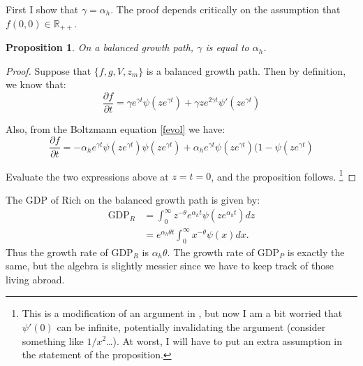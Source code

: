 \documentclass[12pt]{article}
\newtheorem{proposition}[theorem]{Proposition}
\begin{document}
First I show that $\gamma = \alpha_h$.
The proof depends critically on the assumption that $f(0,0)\in \mathbb{R}_{++}$.

\begin{proposition}
  \label{gammaeqalpha}
On a balanced growth path, $\gamma$ is equal to $\alpha_h$.
\end{proposition}
\begin{proof}
    Suppose that $\{f,g,V,z_m\}$ is a balanced growth path.  Then by definition, we know that:
    \begin{equation}
        \label{BoltzLHS}
        \frac{\partial f}{\partial t} = \gamma e^{\gamma t} \psi(z e^{\gamma t}) + \gamma z e^{2 \gamma t} \psi'(z e^{\gamma t})
    \end{equation}

    Also, from the Boltzmann equation \eqref{fevol} we have:
    \[
        \frac{\partial f}{\partial t} = - \alpha_h e^{\gamma t} \psi(z e^{\gamma t}) \psi(z e^{\gamma t}) + \alpha_h e^{\gamma t} \psi(z e^{\gamma t}) (1 - \psi(z e^{\gamma t})
    \]

    Evaluate the two expressions above at $z=t=0$, and the proposition follows. \footnote{
        This is a modification of an argument in \citet{LucasMoll2012}, but now I am a bit worried that $\psi'(0)$ can be infinite, potentially invalidating the argument (consider something like $1/x^2$\dots).  At worst, I will have to put an extra assumption in the statement of the proposition.
}
\end{proof}


      The GDP of Rich on the balanced growth path is given by:
      \begin{align}
        \mbox{GDP}_R &= \int_0^\infty z^{-\theta} e^{\alpha_h t} \psi(z e^{\alpha_h t}) dz \\
        &= e^{\alpha_h \theta t} \int_0^\infty x^{-\theta} \psi(x) dx.
    \end{align}
    Thus the growth rate of $\mbox{GDP}_R$ is $\alpha_h \theta$.  The growth rate of $\mbox{GDP}_P$ is exactly the same, but the algebra is slightly messier since we have to keep track of those living abroad.
\end{document}
